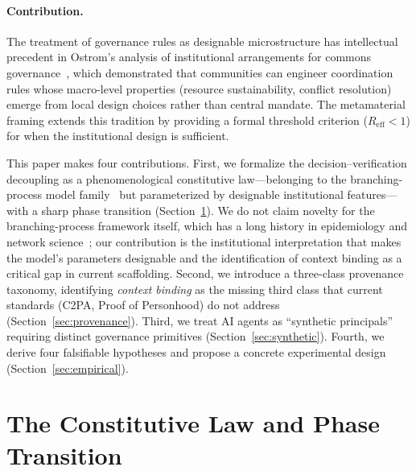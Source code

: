 \documentclass[runningheads]{llncs}
\begin{document}
\paragraph{Contribution.}
The treatment of governance rules as designable microstructure has intellectual precedent in Ostrom's analysis of institutional arrangements for commons governance~\cite{ostrom1990governing}, which demonstrated that communities can engineer coordination rules whose macro-level properties (resource sustainability, conflict resolution) emerge from local design choices rather than central mandate. The metamaterial framing extends this tradition by providing a formal threshold criterion ($R_{\mathrm{eff}} < 1$) for when the institutional design is sufficient.

This paper makes four contributions. First, we formalize the decision--verification decoupling as a phenomenological constitutive law---belonging to the branching-process model family~\cite{anderson1991infectious,hethcote2000mathematics} but parameterized by designable institutional features---with a sharp phase transition (Section~\ref{sec:constitutive}). We do not claim novelty for the branching-process framework itself, which has a long history in epidemiology and network science~\cite{watts2002simple,buldyrev2010catastrophic}; our contribution is the institutional interpretation that makes the model's parameters designable and the identification of context binding as a critical gap in current scaffolding. Second, we introduce a three-class provenance taxonomy, identifying \emph{context binding} as the missing third class that current standards (C2PA, Proof of Personhood) do not address (Section~\ref{sec:provenance}). Third, we treat AI agents as ``synthetic principals'' requiring distinct governance primitives (Section~\ref{sec:synthetic}). Fourth, we derive four falsifiable hypotheses and propose a concrete experimental design (Section~\ref{sec:empirical}).


\section{The Constitutive Law and Phase Transition}
\label{sec:constitutive}
\end{document}
